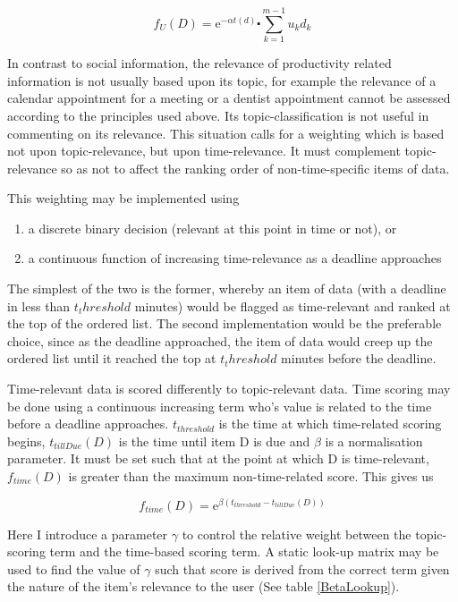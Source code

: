 \begin{equation}\label{BasicScoringRule2}
	f_U (D) = {\mathrm{e}}^{-\alpha t(d)} \centerdot \sum_{k=1}^{m-1} u_kd_k
\end{equation}

In contrast to social information, the relevance of productivity related information is not usually based upon its topic, for example the relevance of a calendar appointment for a meeting or a dentist appointment cannot be assessed according to the principles used above. Its topic-classification is not useful in commenting on its relevance. This situation calls for a weighting which is based not upon topic-relevance, but upon time-relevance. It must complement topic-relevance so as not to affect the ranking order of non-time-specific items of data. 

This weighting may be implemented using 
\begin{enumerate}
  \item a discrete binary decision (relevant at this point in time or not), or 
  \item a continuous function of increasing time-relevance as a deadline approaches
\end{enumerate}

The simplest of the two is the former, whereby an item of data (with a deadline in less than $t_threshold$ minutes) would be flagged as time-relevant and ranked at the top of the ordered list. The second implementation would be the preferable choice, since as the deadline approached, the item of data would creep up the ordered list until it reached the top at $t_threshold$ minutes before the deadline. 

Time-relevant data is scored differently to topic-relevant data. Time scoring may be done using a continuous increasing term who's value is related to the time before a deadline approaches. $t_{threshold}$ is the time at which time-related scoring begins, $t_{tillDue}(D)$ is the time until item D is due and $\beta$ is a normalisation parameter. It must be set such that at the point at which D is time-relevant, $f_{time}(D)$ is greater than the maximum non-time-related score. This gives us

\begin{equation}\label{BasicTimeScoringRule}
	f_{time} (D) = {\mathrm{e}}^{\beta (t_{threshold}-t_{tillDue}(D))}
\end{equation}

Here I introduce a parameter $\gamma$ to control the relative weight between the topic-scoring term and the time-based scoring term. A static look-up matrix may be used to find the value of $\gamma$ such that score is derived from the correct term given the nature of the item's relevance to the user (See table \ref{BetaLookup}).

